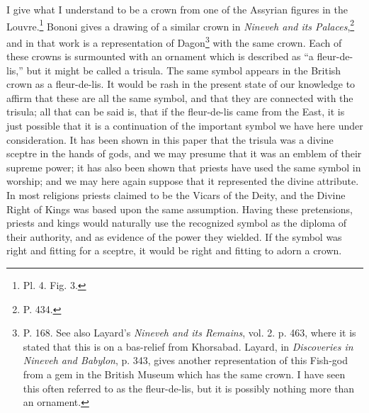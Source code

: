 \documentclass[a4paper, 11pt, oneside, english, landscape, twocolumn]{article}
\begin{document}
I give what I understand to be a crown from one of the Assyrian figures in the Louvre.\footnote{Pl. 4. Fig. 3.} Bononi gives a drawing of a similar crown in \emph{Nineveh and its Palaces},\footnote{P. 434.} and in that work is a representation of Dagon\footnote{P. 168. See also Layard's \emph{Nineveh and its Remains}, vol. 2. p. 463, where it is stated that this is on a bas-relief from Khorsabad. Layard, in \emph{Discoveries in Nineveh and Babylon}, p. 343, gives another representation of this Fish-god from a gem in the British Museum which has the same crown. I have seen this often referred to as the fleur-de-lis, but it is possibly nothing more than an ornament.} with the same crown. Each of these crowns is surmounted with an ornament which is described as ``a fleur-de-lis,'' but it might be called a trisula. The same symbol appears in the British crown as a fleur-de-lis. It would be rash in the present state of our knowledge to affirm that these are all the same symbol, and that they are connected with the trisula; all that can be said is, that if the fleur-de-lis came from the East, it is just possible that it is a continuation of the important symbol we have here under consideration. It has been shown in this paper that the trisula was a divine sceptre in the hands of gods, and we may presume that it was an emblem of their supreme power; it has also been shown that priests have used the same symbol in worship; and we may here again suppose that it represented the divine attribute. In most religions priests claimed to be the Vicars of the Deity, and the Divine Right of Kings was based upon the same assumption. Having these pretensions, priests and kings would naturally use the recognized symbol as the diploma of their authority, and as evidence of the power they wielded. If the symbol was right and fitting for a sceptre, it would be right and fitting to adorn a crown.
\end{document}
